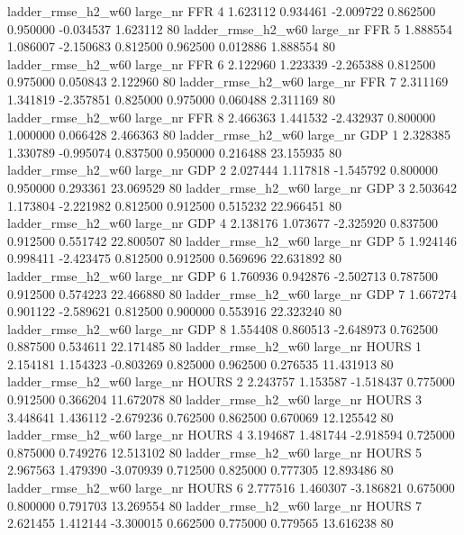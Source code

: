 ladder_rmse_h2_w60   large_nr      FFR                 4  1.623112  0.934461  -2.009722 0.862500 0.950000 -0.034537    1.623112 80
 ladder_rmse_h2_w60   large_nr      FFR                 5  1.888554  1.086007  -2.150683 0.812500 0.962500  0.012886    1.888554 80
 ladder_rmse_h2_w60   large_nr      FFR                 6  2.122960  1.223339  -2.265388 0.812500 0.975000  0.050843    2.122960 80
 ladder_rmse_h2_w60   large_nr      FFR                 7  2.311169  1.341819  -2.357851 0.825000 0.975000  0.060488    2.311169 80
 ladder_rmse_h2_w60   large_nr      FFR                 8  2.466363  1.441532  -2.432937 0.800000 1.000000  0.066428    2.466363 80
 ladder_rmse_h2_w60   large_nr      GDP                 1  2.328385  1.330789  -0.995074 0.837500 0.950000  0.216488   23.155935 80
 ladder_rmse_h2_w60   large_nr      GDP                 2  2.027444  1.117818  -1.545792 0.800000 0.950000  0.293361   23.069529 80
 ladder_rmse_h2_w60   large_nr      GDP                 3  2.503642  1.173804  -2.221982 0.812500 0.912500  0.515232   22.966451 80
 ladder_rmse_h2_w60   large_nr      GDP                 4  2.138176  1.073677  -2.325920 0.837500 0.912500  0.551742   22.800507 80
 ladder_rmse_h2_w60   large_nr      GDP                 5  1.924146  0.998411  -2.423475 0.812500 0.912500  0.569696   22.631892 80
 ladder_rmse_h2_w60   large_nr      GDP                 6  1.760936  0.942876  -2.502713 0.787500 0.912500  0.574223   22.466880 80
 ladder_rmse_h2_w60   large_nr      GDP                 7  1.667274  0.901122  -2.589621 0.812500 0.900000  0.553916   22.323240 80
 ladder_rmse_h2_w60   large_nr      GDP                 8  1.554408  0.860513  -2.648973 0.762500 0.887500  0.534611   22.171485 80
 ladder_rmse_h2_w60   large_nr    HOURS                 1  2.154181  1.154323  -0.803269 0.825000 0.962500  0.276535   11.431913 80
 ladder_rmse_h2_w60   large_nr    HOURS                 2  2.243757  1.153587  -1.518437 0.775000 0.912500  0.366204   11.672078 80
 ladder_rmse_h2_w60   large_nr    HOURS                 3  3.448641  1.436112  -2.679236 0.762500 0.862500  0.670069   12.125542 80
 ladder_rmse_h2_w60   large_nr    HOURS                 4  3.194687  1.481744  -2.918594 0.725000 0.875000  0.749276   12.513102 80
 ladder_rmse_h2_w60   large_nr    HOURS                 5  2.967563  1.479390  -3.070939 0.712500 0.825000  0.777305   12.893486 80
 ladder_rmse_h2_w60   large_nr    HOURS                 6  2.777516  1.460307  -3.186821 0.675000 0.800000  0.791703   13.269554 80
 ladder_rmse_h2_w60   large_nr    HOURS                 7  2.621455  1.412144  -3.300015 0.662500 0.775000  0.779565   13.616238 80
